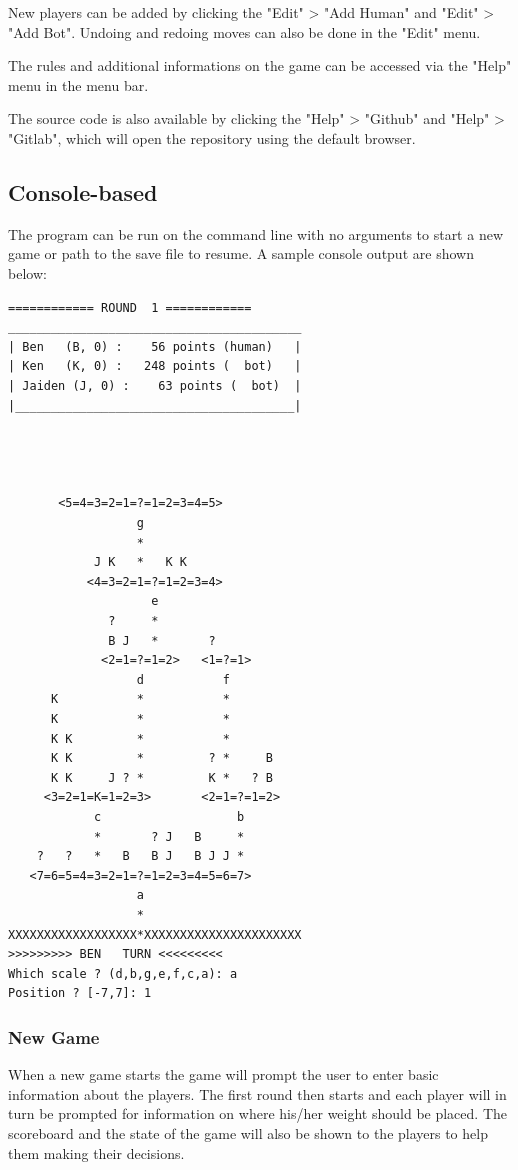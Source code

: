 \documentclass[12pt]{article}
\begin{document}
New players can be added by clicking the "Edit" > "Add Human" and "Edit" > "Add
Bot". Undoing and redoing moves can also be done in the "Edit" menu.

The rules and additional informations on the game can be accessed via the "Help"
menu in the menu bar.

The source code is also available by clicking the "Help" > "Github" and "Help" >
"Gitlab", which will open the repository using the default browser.

\subsection{Console-based}
The program can be run on the command line with no arguments to start a new game
or path to the save file to resume. A sample console output are shown below:

\begin{verbatim}
============ ROUND  1 ============
_________________________________________
| Ben   (B, 0) :    56 points (human)   |
| Ken   (K, 0) :   248 points (  bot)   |
| Jaiden (J, 0) :    63 points (  bot)  |
|_______________________________________|




       <5=4=3=2=1=?=1=2=3=4=5>
                  g
                  *
            J K   *   K K
           <4=3=2=1=?=1=2=3=4>
                    e
              ?     *
              B J   *       ?
             <2=1=?=1=2>   <1=?=1>
                  d           f
      K           *           *
      K           *           *
      K K         *           *
      K K         *         ? *     B
      K K     J ? *         K *   ? B
     <3=2=1=K=1=2=3>       <2=1=?=1=2>
            c                   b
            *       ? J   B     *
    ?   ?   *   B   B J   B J J *
   <7=6=5=4=3=2=1=?=1=2=3=4=5=6=7>
                  a
                  *
XXXXXXXXXXXXXXXXXX*XXXXXXXXXXXXXXXXXXXXXX
>>>>>>>>> BEN   TURN <<<<<<<<<
Which scale ? (d,b,g,e,f,c,a): a
Position ? [-7,7]: 1
\end{verbatim}

\subsubsection{New Game}

When a new game starts the game will prompt the user to enter basic information
about the players. The first round then starts and each player will in turn be
prompted for information on where his/her weight should be placed. The
scoreboard and the state of the game will also be shown to the players to help
them making their decisions.
\end{document}
